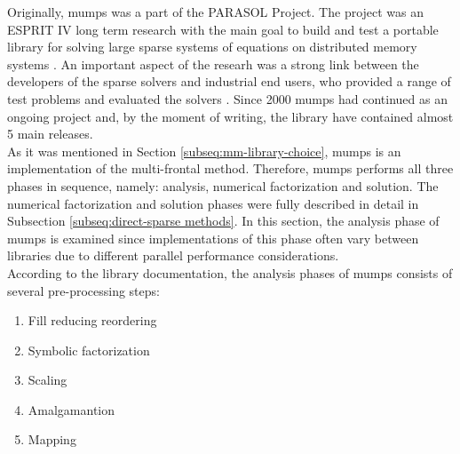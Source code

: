 \label{subseq:mumps-review}

Originally, \acrfull{mumps} was a part of the PARASOL Project. The project was an ESPRIT IV long term research with the main goal to build and test a portable library for solving large sparse systems of equations on distributed memory systems \cite{PARASOL}. An important aspect of the researh was a strong link between the developers of the sparse solvers and industrial end users, who provided a range of test problems and evaluated the solvers \cite{MUMPS:description}. Since 2000 \acrshort{mumps} had continued as an ongoing project and, by the moment of writing, the library have contained almost 5 main releases.\\



As it was mentioned in Section \ref{subseq:mm-library-choice}, \acrshort{mumps} is an implementation of the multi-frontal method. Therefore, \acrshort{mumps} performs all three phases in sequence, namely: analysis, numerical factorization and solution. The numerical factorization and solution phases were fully described in detail in Subsection \ref{subseq:direct-sparse methods}. In this section, the analysis phase of \acrshort{mumps} is examined since implementations of this phase often vary between libraries due to different parallel performance considerations.\\


According to the library documentation, the analysis phases of \acrshort{mumps} consists of several pre-processing steps:

\begin{enumerate}
  \item Fill reducing reordering \label{mumps:analysis-steps:1}
  \item Symbolic factorization \label{mumps:analysis-steps:2}
  \item Scaling \label{mumps:analysis-steps:3}
  \item Amalgamantion \label{mumps:analysis-steps:4}
  \item Mapping \label{mumps:analysis-steps:5}
\end{enumerate}


